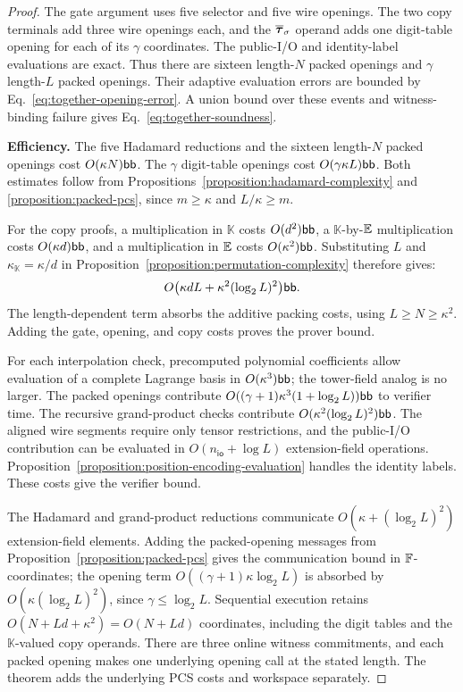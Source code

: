 \begin{proof}
The gate argument uses five selector and five wire openings.
The two copy terminals add three wire openings each, and the
\(\overline{\bm\tau}_\sigma\) operand adds one digit-table opening
for each of its \(\gamma\) coordinates.
The public-I/O and identity-label evaluations are exact.
Thus there are sixteen length-\(N\) packed openings and
\(\gamma\) length-\(L\) packed openings.
Their adaptive evaluation errors are bounded by
Eq.~\eqref{eq:together-opening-error}.
A union bound over these events and witness-binding failure
gives Eq.~\eqref{eq:together-soundness}.

\smallskip\noindent\textbf{Efficiency.}
The five Hadamard reductions and the sixteen length-\(N\)
packed openings cost \(O(\kappa N)\mathsf{bb}\).
The \(\gamma\) digit-table openings cost
\(O(\gamma\kappa L)\mathsf{bb}\).
Both estimates follow from
Propositions~\ref{proposition:hadamard-complexity} and
\ref{proposition:packed-pcs}, since \(m\geq\kappa\) and
\(L/\kappa\geq m\).

For the copy proofs, a multiplication in \(\mathbb K\) costs
\(O(d^2)\mathsf{bb}\), a \(\mathbb K\)-by-\(\mathbb{E}\)
multiplication costs \(O(\kappa d)\mathsf{bb}\), and a multiplication
in \(\mathbb{E}\) costs \(O(\kappa^2)\mathsf{bb}\).
Substituting \(L\) and \(\kappa_{\mathbb K}=\kappa/d\)
in Proposition~\ref{proposition:permutation-complexity}
therefore gives:
\[
    O\bigl(\kappa dL+\kappa^2(\log_2L)^2\bigr)\mathsf{bb}.
\]
The length-dependent term absorbs the additive packing costs,
using \(L\geq N\geq\kappa^2\).
Adding the gate, opening, and copy costs proves the prover bound.

For each interpolation check, precomputed polynomial coefficients
allow evaluation of a complete Lagrange basis in
\(O(\kappa^3)\mathsf{bb}\); the tower-field analog is no larger.
The packed openings contribute
\(O((\gamma+1)\kappa^3(1+\log_2L))\mathsf{bb}\)
to verifier time.
The recursive grand-product checks contribute
\(O(\kappa^2(\log_2L)^2)\mathsf{bb}\).
The aligned wire segments require only tensor restrictions,
and the public-I/O contribution can be evaluated in
\(O(n_{\mathsf{io}}+\log L)\) extension-field operations.
Proposition~\ref{proposition:position-encoding-evaluation}
handles the identity labels. These costs give the verifier bound.

The Hadamard and grand-product reductions communicate
\(O(\kappa+(\log_2L)^2)\) extension-field elements.
Adding the packed-opening messages from
Proposition~\ref{proposition:packed-pcs} gives the communication
bound in \({\mathbb{F}}\)-coordinates; the opening term
\(O((\gamma+1)\kappa\log_2L)\) is absorbed by
\(O(\kappa(\log_2L)^2)\), since \(\gamma\leq\log_2L\).
Sequential execution retains \(O(N+Ld+\kappa^2)=O(N+Ld)\)
coordinates, including the digit tables and the
\(\mathbb K\)-valued copy operands.
There are three online witness commitments, and each packed
opening makes one underlying opening call at the stated length.
The theorem adds the underlying PCS costs and workspace separately.
\end{proof}

